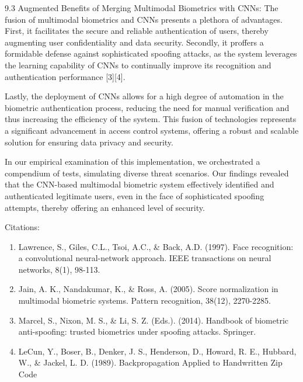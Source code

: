 \documentclass[11pt]{article}
\begin{document}
9.3 Augmented Benefits of Merging Multimodal Biometrics with CNNs: The fusion of multimodal biometrics and CNNs presents a plethora of advantages. First, it facilitates the secure and reliable authentication of users, thereby augmenting user confidentiality and data security. Secondly, it proffers a formidable defense against sophisticated spoofing attacks, as the system leverages the learning capability of CNNs to continually improve its recognition and authentication performance [3][4].


Lastly, the deployment of CNNs allows for a high degree of automation in the biometric authentication process, reducing the need for manual verification and thus increasing the efficiency of the system. This fusion of technologies represents a significant advancement in access control systems, offering a robust and scalable solution for ensuring data privacy and security.


In our empirical examination of this implementation, we orchestrated a compendium of tests, simulating diverse threat scenarios. Our findings revealed that the CNN-based multimodal biometric system effectively identified and authenticated legitimate users, even in the face of sophisticated spoofing attempts, thereby offering an enhanced level of security.


Citations:

\begin{enumerate}
  \item Lawrence, S., Giles, C.L., Tsoi, A.C., \& Back, A.D. (1997). Face recognition: a convolutional neural-network approach. IEEE transactions on neural networks, 8(1), 98-113.
  \item Jain, A. K., Nandakumar, K., \& Ross, A. (2005). Score normalization in multimodal biometric systems. Pattern recognition, 38(12), 2270-2285.
  \item Marcel, S., Nixon, M. S., \& Li, S. Z. (Eds.). (2014). Handbook of biometric anti-spoofing: trusted biometrics under spoofing attacks. Springer.
  \item LeCun, Y., Boser, B., Denker, J. S., Henderson, D., Howard, R. E., Hubbard, W., \& Jackel, L. D. (1989). Backpropagation Applied to Handwritten Zip Code
\end{enumerate}
\end{document}

